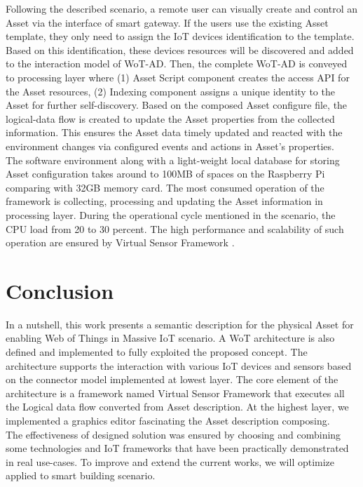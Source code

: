 Following the described scenario, a remote user can visually create and control an Asset via the interface of smart gateway. If the users use the existing Asset template, they only need to assign the IoT devices identification to the template. Based on this identification, these devices resources will be discovered and added to the interaction model of WoT-AD. Then, the complete WoT-AD is conveyed to processing layer where (1) Asset Script component creates the access API for the Asset resources, (2) Indexing component assigns a unique identity to the Asset for further self-discovery. Based on the composed Asset configure file, the logical-data flow is created to update the Asset properties from the collected information. This ensures the Asset data timely updated and reacted with the environment changes via configured events and actions in Asset's properties. \\

The software environment along with a light-weight local database for storing Asset configuration takes around to 100MB of spaces on the Raspberry Pi comparing with 32GB memory card. The most consumed operation of the framework is collecting, processing and updating the Asset information in processing layer. During the operational cycle mentioned in the scenario, the CPU load from 20 to 30 percent.
The high performance and scalability of such operation are ensured by Virtual Sensor Framework \cite{kim2017scalable}. 

\section{Conclusion}
In a nutshell, this work presents a semantic description for the physical Asset for enabling Web of Things in Massive IoT scenario. A WoT architecture is also defined and implemented to fully exploited the proposed concept. The architecture supports the interaction with various IoT devices and sensors based on the connector model implemented at lowest layer. The core element of the architecture is a framework named Virtual Sensor Framework that executes all the Logical data flow converted from Asset description. At the highest layer, we implemented a graphics editor fascinating the Asset description composing.\\
The effectiveness of designed solution was ensured by choosing and combining some technologies and IoT frameworks that have been practically demonstrated in real use-cases. To improve and extend the current works, we will optimize applied to smart building scenario. 

